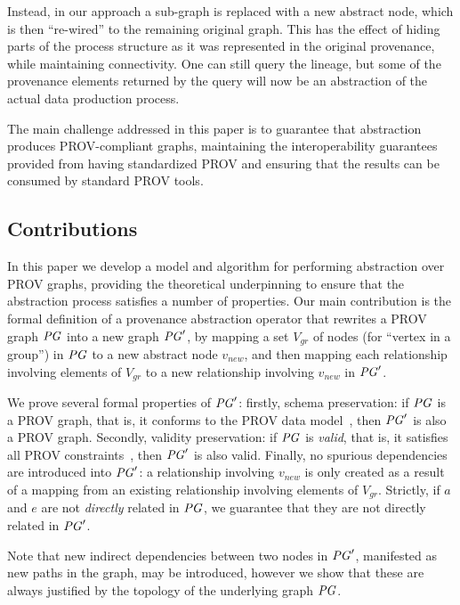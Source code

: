 Instead, in our approach a sub-graph is replaced with a new abstract node, which is then ``re-wired'' to the remaining original graph. This has the effect of hiding parts of the process structure as it was represented in the original provenance, while maintaining connectivity. One can still query the lineage, but some of the provenance elements returned by the query will now be an abstraction of the actual data production process.

The main challenge addressed in this paper is to guarantee that abstraction produces PROV-compliant  graphs,   maintaining the interoperability guarantees provided from having standardized PROV and ensuring that the results can be consumed by standard PROV tools. %

\subsection{Contributions} \label{sec:contributions}

In this paper we develop a model and algorithm for performing  abstraction over PROV graphs, providing the theoretical underpinning to ensure that the abstraction process satisfies a number of properties.
%
Our main contribution is the formal definition of a provenance abstraction operator that rewrites  a PROV graph $\mathit{PG}$ into a new graph $\mathit{PG}'$, by mapping a set $V_{gr}$ of nodes (for ``vertex in a group'') in $\mathit{PG}$ to a new abstract node $v_{new}$, and then mapping each relationship involving elements of $V_{gr}$ to a new relationship involving $v_{new}$ in $\mathit{PG}'$. 

We prove several formal properties of $\mathit{PG}'$: firstly, schema preservation: if $\mathit{PG}$ is a PROV graph, that is, it conforms to the PROV data model~\citep{w3c-prov-dm}, then $\mathit{PG}'$ is also a PROV graph. Secondly, validity preservation: if $\mathit{PG}$ is \textit{valid}, that is, it satisfies all PROV constraints~\citep{w3c-prov-dm}, then $\mathit{PG}'$ is also valid. Finally, no spurious dependencies are introduced into $\mathit{PG}'$: a  relationship involving $v_{new}$ is only created as a result of a mapping from an existing relationship involving elements of $V_{gr}$. Strictly, if $a$ and $e$ are not \textit{directly} related in $\mathit{PG}$, we guarantee that they are not directly related in $\mathit{PG}'$. 

Note that new indirect dependencies between two nodes in $\mathit{PG}'$, manifested as new paths in the graph, may be introduced, however we show that these are always justified by the topology of the underlying graph $\mathit{PG}$.

